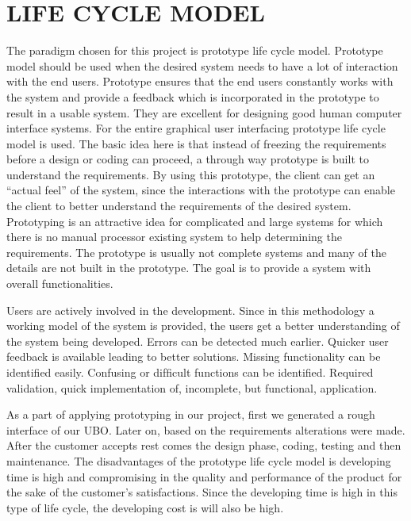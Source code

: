 \documentclass[12pt,a4paper,oneside]{report}
\begin{document}
\section{LIFE CYCLE MODEL}
\par The paradigm chosen for this project is prototype life cycle model. Prototype model should be used when the desired system needs to have a lot of interaction with the end users. Prototype ensures that the end users constantly works with the system and provide a feedback which is incorporated in the prototype to result in a usable system. They are excellent for designing good human computer interface systems. For the entire graphical user interfacing prototype life cycle model is used. The basic idea here is that instead of freezing the requirements before a design or coding can proceed, a through way prototype is built to understand the requirements. By using this prototype, the client can get an “actual feel” of the system, since the interactions with the prototype can enable the client to better understand the requirements of the desired system. Prototyping is an attractive idea for complicated and large systems for which there is no manual processor existing system to help determining the requirements. The prototype is usually not complete systems and many of the details are not built in the prototype. The goal is to provide a system with overall functionalities.\\
\par Users are actively involved in the development. Since in this methodology a working model of the system is provided, the users get a better understanding of the system being developed. Errors can be detected much earlier. Quicker user feedback is available leading to better solutions. Missing functionality can be identiﬁed easily. Confusing or difﬁcult functions can be identiﬁed. Required validation, quick implementation of, incomplete, but functional, application.\\
\par  As a part of applying prototyping in our project, ﬁrst we generated a rough interface of our UBO. Later on, based on the requirements alterations were made. After the customer accepts rest comes the design phase, coding, testing and then maintenance. The disadvantages of the prototype life cycle model is developing time is high and compromising in the quality and performance of the product for the sake of the customer’s satisfactions. Since the developing time is high in this type of life cycle, the developing cost is will also be high.
\end{document}
